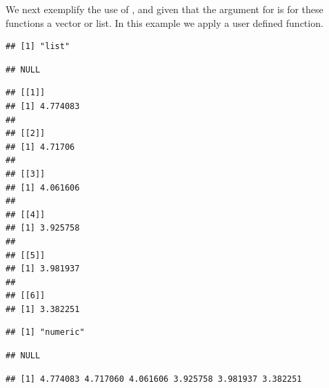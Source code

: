 \documentclass[krantz2]{krantz}\usepackage{knitr}%
\begin{document}
We next exemplify the use of ,  and  given that the argument for  is for these functions a vector or list. In this example we apply a user defined function.
\begin{knitrout}\footnotesize
{}\color{fgcolor}\begin{kframe}
\begin{alltt}
\hlstd{(}\hlstd{)} 
 \hlkwb{<-} \hlstd{(}\hlstd{)} 
 \hlkwb{<-} \hlstd{(}\hlstd{,} \hlstd{) \{} \hlopt{+} 
 \hlkwb{<-} \hlstd{(}     \hlstd{=} \hlstd{)}
\end{alltt}
\begin{verbatim}
## [1] "list"
\end{verbatim}
\begin{alltt}
\end{alltt}
\begin{verbatim}
## NULL
\end{verbatim}
\begin{alltt}
\end{alltt}
\begin{verbatim}
## [[1]]
## [1] 4.774083
## 
## [[2]]
## [1] 4.71706
## 
## [[3]]
## [1] 4.061606
## 
## [[4]]
## [1] 3.925758
## 
## [[5]]
## [1] 3.981937
## 
## [[6]]
## [1] 3.382251
\end{verbatim}
\end{kframe}
\end{knitrout}

\begin{knitrout}\footnotesize
{}\color{fgcolor}\begin{kframe}
\begin{alltt}
 \hlkwb{<-} \hlstd{(}     \hlstd{=} \hlstd{)}
\end{alltt}
\begin{verbatim}
## [1] "numeric"
\end{verbatim}
\begin{alltt}
\end{alltt}
\begin{verbatim}
## NULL
\end{verbatim}
\begin{alltt}
\end{alltt}
\begin{verbatim}
## [1] 4.774083 4.717060 4.061606 3.925758 3.981937 3.382251
\end{verbatim}
\end{kframe}
\end{knitrout}
\end{document}
